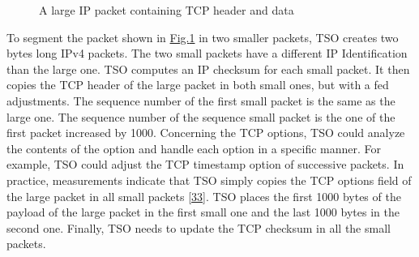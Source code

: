 \documentclass[letterpaper,10pt,english]{sphinxmanual}
\begin{document}
\begin{figure}[htbp]
\caption{A large IP packet containing TCP header and data}\label{\detokenize{mptcp:id82}}\label{\detokenize{mptcp:fig-mptcp-tso}}\end{figure}
\sphinxAtStartPar
To segment the packet shown in \hyperref[\detokenize{mptcp:fig-mptcp-tso}]{Fig.\@ \ref{\detokenize{mptcp:fig-mptcp-tso}}} in two smaller packets, TSO creates two  bytes long IPv4 packets. The two small packets have a different IP Identification than the large one. TSO computes an IP checksum for each small packet. It then copies the TCP header of the large packet in both small ones, but with a fed adjustments. The sequence number of the  first small packet is the same as the large one. The sequence number of the sequence small packet is the one of the first packet increased by 1000.
Concerning the TCP options, TSO could analyze the contents of the option and handle each option in a specific manner. For example, TSO could adjust the TCP timestamp option of successive packets. In practice, measurements indicate that TSO simply copies the TCP options field of the large packet in all small packets {[}\hyperlink{cite.biblio:id8938}{33}{]}. TSO places the first 1000 bytes of the payload of the large packet in the first small one and the last 1000 bytes in the second one. Finally, TSO needs to update the TCP checksum in all the small packets.
\end{document}

